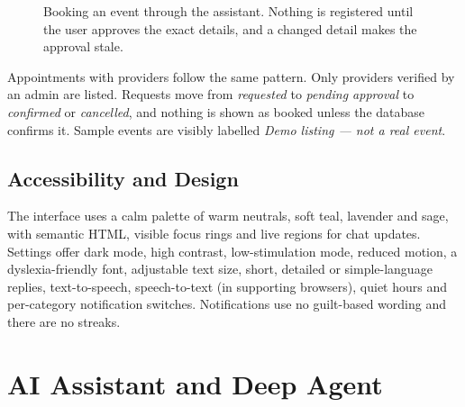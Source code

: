 \documentclass[11pt,a4paper]{article}
\begin{document}
\begin{figure}[H]
\centering
{}
\caption{Booking an event through the assistant. Nothing is registered until the user approves the exact details, and a changed detail makes the approval stale.}
\label{fig:booking}
\end{figure}

Appointments with providers follow the same pattern. Only providers verified by an admin are listed.
Requests move from \emph{requested} to \emph{pending approval} to \emph{confirmed} or
\emph{cancelled}, and nothing is shown as booked unless the database confirms it. Sample events are
visibly labelled \emph{Demo listing --- not a real event}.

\subsection{Accessibility and Design}
The interface uses a calm palette of warm neutrals, soft teal, lavender and sage, with semantic
HTML, visible focus rings and live regions for chat updates. Settings offer dark mode, high contrast,
low-stimulation mode, reduced motion, a dyslexia-friendly font, adjustable text size, short, detailed
or simple-language replies, text-to-speech, speech-to-text (in supporting browsers), quiet hours and
per-category notification switches. Notifications use no guilt-based wording and there are no streaks.

\section{AI Assistant and Deep Agent}\label{sec:agent}
\end{document}
